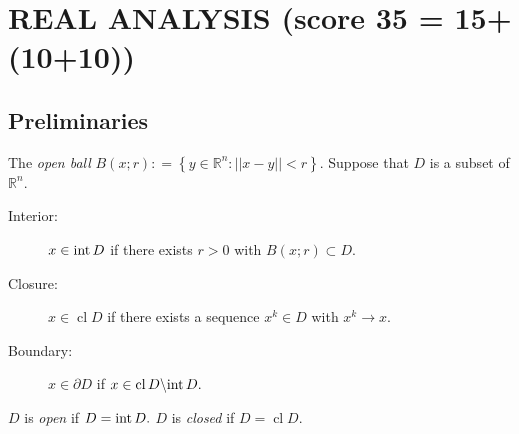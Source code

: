 \documentclass[12pt]{article}
\numberwithin{equation}{section}  %
\numberwithin{table}{section}
\numberwithin{algorithm}{section}
\def\Rn{\mathbb{R}^n}
\theoremstyle{definition}
\DeclareMathOperator{\cl}{{cl}}
\newcommand{\Int}{{\rm int\,}}%
\newcommand{\<}{\langle}
\renewcommand{\>}{\rangle}
\begin{document}
\section{REAL ANALYSIS
{\small(score 35 = 15+(10+10))}
}
\subsection{Preliminaries}
The {\em open ball} $B(x;r) : = \left\{ y \in \Rn : ||x-y|| < r
\right\}.$ Suppose that $D$ is a subset of $\Rn$.
\begin{description}
\item[Interior:]
$x \in \Int D$ if there exists $r > 0$ with $B(x;r) \subset D$.
\item[Closure:]
$x \in \cl D$ if there exists a sequence $x^k \in D$ with $x^k
\rightarrow x.$
\item[Boundary:]
$x \in \partial D$ if $x\in \cl D \backslash \Int D.$
\end{description}
$D$ is {\em open} if $D = \Int D.$ 
$D$ is {\em closed} if $D = \cl D.$ \\
\end{document}
